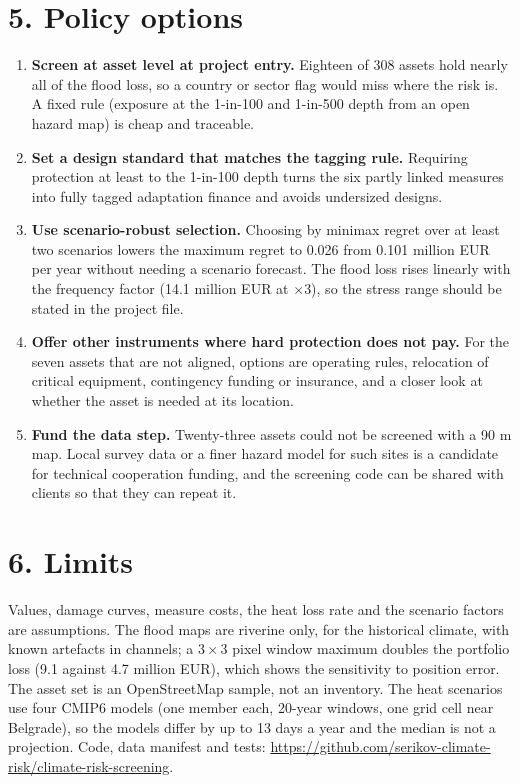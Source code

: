 \documentclass[11pt,a4paper]{article}
\begin{document}
\section*{5. Policy options}
\begin{enumerate}
\setlength\itemsep{2pt}
\item \textbf{Screen at asset level at project entry.} Eighteen of 308 assets hold nearly all of the flood loss, so a country or sector flag would miss where the risk is. A fixed rule (exposure at the 1-in-100 and 1-in-500 depth from an open hazard map) is cheap and traceable.
\item \textbf{Set a design standard that matches the tagging rule.} Requiring protection at least to the 1-in-100 depth turns the six partly linked measures into fully tagged adaptation finance and avoids undersized designs.
\item \textbf{Use scenario-robust selection.} Choosing by minimax regret over at least two scenarios lowers the maximum regret to 0.026 from 0.101 million EUR per year without needing a scenario forecast. The flood loss rises linearly with the frequency factor (14.1 million EUR at $\times$3), so the stress range should be stated in the project file.
\item \textbf{Offer other instruments where hard protection does not pay.} For the seven assets that are not aligned, options are operating rules, relocation of critical equipment, contingency funding or insurance, and a closer look at whether the asset is needed at its location.
\item \textbf{Fund the data step.} Twenty-three assets could not be screened with a 90 m map. Local survey data or a finer hazard model for such sites is a candidate for technical cooperation funding, and the screening code can be shared with clients so that they can repeat it.
\end{enumerate}

\section*{6. Limits}
Values, damage curves, measure costs, the heat loss rate and the scenario factors are assumptions. The flood maps are riverine only, for the historical climate, with known artefacts in channels; a 3\,$\times$\,3 pixel window maximum doubles the portfolio loss (9.1 against 4.7 million EUR), which shows the sensitivity to position error. The asset set is an OpenStreetMap sample, not an inventory. The heat scenarios use four CMIP6 models (one member each, 20-year windows, one grid cell near Belgrade), so the models differ by up to 13 days a year and the median is not a projection. Code, data manifest and tests: \url{https://github.com/serikov-climate-risk/climate-risk-screening}.
\end{document}
